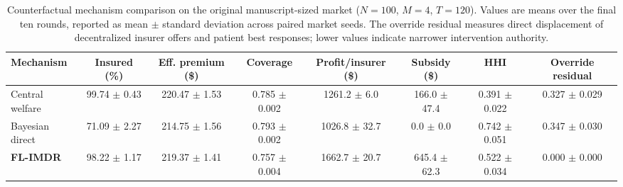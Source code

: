 \begin{table}[t]
\centering
\caption{Counterfactual mechanism comparison on the original manuscript-sized market ($N=100$, $M=4$, $T=120$). Values are means over the final ten rounds, reported as mean $\pm$ standard deviation across paired market seeds. The override residual measures direct displacement of decentralized insurer offers and patient best responses; lower values indicate narrower intervention authority.}
\label{tab:mechanism_numerical_comparison}
\small
\renewcommand{\arraystretch}{1.25}
\begin{tabular}{lccccccc}
\toprule
Mechanism & Insured (\%) & Eff. premium (\$) & Coverage & Profit/insurer (\$) & Subsidy (\$) & HHI & Override residual \\
\midrule
Central welfare & 99.74 $\pm$ 0.43 & 220.47 $\pm$ 1.53 & 0.785 $\pm$ 0.002 & 1261.2 $\pm$ 6.0 & 166.0 $\pm$ 47.4 & 0.391 $\pm$ 0.022 & 0.327 $\pm$ 0.029 \\
Bayesian direct & 71.09 $\pm$ 2.27 & 214.75 $\pm$ 1.56 & 0.793 $\pm$ 0.002 & 1026.8 $\pm$ 32.7 & 0.0 $\pm$ 0.0 & 0.742 $\pm$ 0.051 & 0.347 $\pm$ 0.030 \\
\textbf{FL-IMDR} & 98.22 $\pm$ 1.17 & 219.37 $\pm$ 1.41 & 0.757 $\pm$ 0.004 & 1662.7 $\pm$ 20.7 & 645.4 $\pm$ 62.3 & 0.522 $\pm$ 0.034 & 0.000 $\pm$ 0.000 \\
\bottomrule
\end{tabular}
\end{table}
